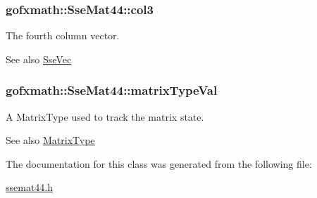 \subsubsection[{col3}]{ gofxmath\+::\+Sse\+Mat44\+::col3}\label{classgofxmath_1_1_sse_mat44_a81cab6f74f373b15a2a9036bc9eb3101}


The fourth column vector. 

\begin{DoxySeeAlso}{See also}
\hyperlink{namespacegofxmath_a634570ddcd2496053ee966227080e02f}{Sse\+Vec} 
\end{DoxySeeAlso}
\hypertarget{classgofxmath_1_1_sse_mat44_a8526d131085d2a0745f26b6cb9ce26a3}{}
\subsubsection[{matrix\+Type\+Val}]{ gofxmath\+::\+Sse\+Mat44\+::matrix\+Type\+Val}\label{classgofxmath_1_1_sse_mat44_a8526d131085d2a0745f26b6cb9ce26a3}


A Matrix\+Type used to track the matrix state. 

\begin{DoxySeeAlso}{See also}
\hyperlink{group___s_i_s_d_mat_math_ga0434ae8f7ee0d8d40277184552eebef4}{Matrix\+Type} 
\end{DoxySeeAlso}


The documentation for this class was generated from the following file\+:\begin{DoxyCompactItemize}
\item 
\hyperlink{ssemat44_8h}{ssemat44.\+h}\end{DoxyCompactItemize}
